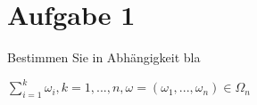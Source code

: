 \documentclass[11pt]{amsart}
\begin{document}
\section{Aufgabe 1}
{\color{green} Bestimmen Sie in Abhängigkeit bla}

$\sum_{i=1}^k\omega_i, k =1,...,n, \omega=(\omega_1,...,\omega_n)\in \Omega_n$
\end{document}
